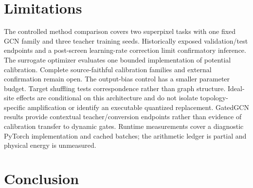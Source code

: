 \documentclass[10pt,twocolumn]{article}
\begin{document}
\section{Limitations}
The controlled method comparison covers two superpixel tasks with one fixed GCN family and three teacher training seeds. Historically exposed validation/test endpoints and a post-screen learning-rate correction limit confirmatory inference. The surrogate optimizer evaluates one bounded implementation of potential calibration. Complete source-faithful calibration families and external confirmation remain open. The output-bias control has a smaller parameter budget. Target shuffling tests correspondence rather than graph structure. Ideal-site effects are conditional on this architecture and do not isolate topology-specific amplification or identify an executable quantized replacement. GatedGCN results provide contextual teacher/conversion endpoints rather than evidence of calibration transfer to dynamic gates. Runtime measurements cover a diagnostic PyTorch implementation and cached batches; the arithmetic ledger is partial and physical energy is unmeasured.

\section{Conclusion}




\end{document}
